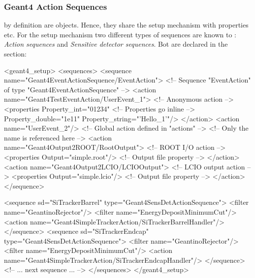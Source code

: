 \subsubsection{Geant4 Action Sequences}
\label{sec:ddg4-setup-xml-geant4-sequences}

\noindent
{} by definition are  objects.
Hence, they share the setup mechanism with properties etc. For the setup
mechanism two different types of sequences are known to \DDG:
{\it{Action sequences}} and {\it{Sensitive detector sequences}}. Bot are declared in
the  section:
\begin{code}
<geant4_setup>
  <sequences>
    <sequence name="Geant4EventActionSequence/EventAction"> <!-- Sequence "EventAction" of type
                                                                 "Geant4EventActionSequence" -->
      <action name="Geant4TestEventAction/UserEvent_1">     <!-- Anonymous action                   -->
        <properties Property_int="01234"                    <!-- Properties go inline               -->
            Property_double="1e11"
            Property_string="'Hello_1'"/>
      </action>
      <action name="UserEvent_2"/>                          <!-- Global action defined in "actions" -->
                                                            <!-- Only the name is referenced here   -->
      <action name="Geant4Output2ROOT/RootOutput">          <!-- ROOT I/O action                    -->
        <properties Output="simple.root"/>                  <!-- Output file property               -->
      </action>
      <action name="Geant4Output2LCIO/LCIOOutput">          <!-- LCIO output action                 -->
        <properties Output="simple.lcio"/>                  <!-- Output file property               -->
      </action>
    </sequence>


    <sequence sd="SiTrackerBarrel" type="Geant4SensDetActionSequence">
      <filter name="GeantinoRejector"/>
      <filter name="EnergyDepositMinimumCut"/>
      <action name="Geant4SimpleTrackerAction/SiTrackerBarrelHandler"/>
    </sequence>
    <sequence sd="SiTrackerEndcap" type="Geant4SensDetActionSequence">
      <filter name="GeantinoRejector"/>
      <filter name="EnergyDepositMinimumCut"/>
      <action name="Geant4SimpleTrackerAction/SiTrackerEndcapHandler"/>
    </sequence>
    <!--    ... next sequence ...     -->
  </sequences>
</geant4_setup>
\end{code}
